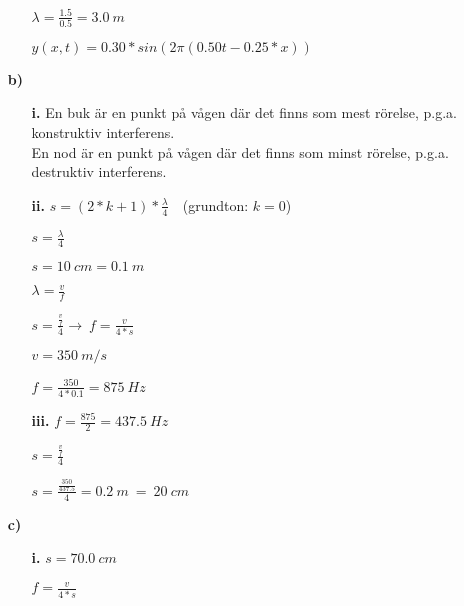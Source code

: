 \documentclass[12pt, letterpaper, twoside]{article}
\begin{document}
\begin{flushleft}
\begin{itemize}
\begin{itemize}
    $ \lambda = \frac{1.5}{0.5} = 3.0\ m $

    $ y(x,t)=0.30*sin(2\pi (0.50t - 0.25*x)) $

    \hfill

\end{itemize}

\item[\textbf{b)}]

\begin{itemize}
\item[\textbf{i.}]
    En buk är en punkt på vågen där det finns som mest rörelse, p.g.a. konstruktiv interferens. \\
    En nod är en punkt på vågen där det finns som minst rörelse, p.g.a. destruktiv interferens.

    \hfill

\item[\textbf{ii.}]
    $ s = (2*k + 1) * \frac{\lambda}{4}\ \ \  $ (grundton: $ k = 0 $)

    $ s = \frac{\lambda}{4} $

    $ s = 10\ cm = 0.1\ m $

    $ \lambda = \frac{v}{f} $

    $ s = \frac{\frac{v}{f}}{4} \rightarrow\ f = \frac{v}{4*s} $

    $ v = 350\ m/s $

    $ f = \frac{350}{4*0.1} = 875\ Hz $

    \hfill

\item[\textbf{iii.}]
    $ f = \frac{875}{2} = 437.5\ Hz $

    $ s = \frac{\frac{v}{f}}{4} $

    $ s = \frac{\frac{350}{437.5}}{4} = 0.2\ m\ =\ 20\ cm $

    \hfill

\end{itemize}

\item[\textbf{c)}]

\begin{itemize}

\item[\textbf{i.}]
    $ s = 70.0\ cm $

    $ f = \frac{v}{4*s} $

    $  $



\end{itemize}
\end{itemize}

\end{flushleft}
\end{document}
